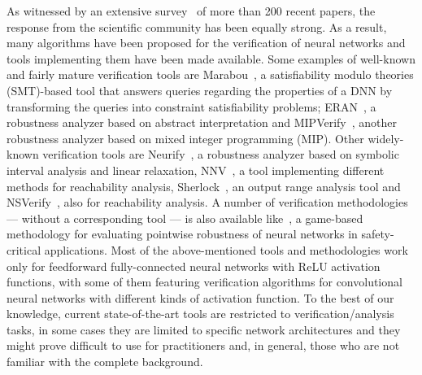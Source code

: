 As witnessed by an extensive survey~\cite{huang2018safety}
of more than 200 recent papers, the response from the scientific
community has been equally strong. 
As a result, many algorithms have been proposed for the verification 
of neural networks and tools implementing them have been made
available. Some examples of well-known and fairly mature verification
tools are Marabou~\cite{DBLP:conf/cav/KatzHIJLLSTWZDK19}, a
satisfiability modulo theories (SMT)-based tool that answers queries
regarding the properties of a DNN by transforming the queries into 
constraint satisfiability problems; ERAN~\cite{DBLP:conf/iclr/SinghGPV19}, 
a robustness analyzer based on abstract interpretation and 
MIPVerify~\cite{DBLP:conf/iclr/TjengXT19},
another robustness analyzer based on mixed integer programming
(MIP). Other widely-known verification tools are
Neurify~\cite{DBLP:conf/nips/WangPWYJ18}, a robustness analyzer based
on symbolic interval analysis and linear relaxation,
NNV~\cite{DBLP:journals/corr/abs-2004-05519}, a tool implementing
different methods for reachability analysis,
Sherlock~\cite{DBLP:conf/hybrid/DuttaCJST19}, an output range analysis
tool and NSVerify~\cite{DBLP:conf/kr/AkitundeLMP18}, also for
reachability analysis. A number of verification methodologies ---
without a corresponding tool --- is also available
like~\cite{DBLP:journals/corr/abs-1807-03571}, a game-based 
methodology for evaluating pointwise robustness of neural networks in
safety-critical applications. Most of the above-mentioned tools and
methodologies work only for feedforward fully-connected neural
networks with ReLU activation functions, with some of them
featuring verification algorithms for convolutional neural networks 
with different kinds of activation function. To the best of our
knowledge, current state-of-the-art tools are restricted to
verification/analysis tasks, in some cases they are limited to
specific network architectures and they might prove difficult to use
for practitioners and, in general, those who are not familiar with
the complete background.

